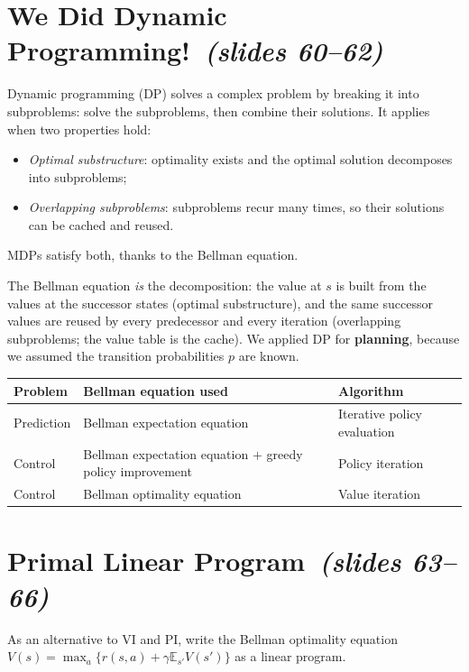\documentclass[11pt,a4paper]{article}
\newcommand{\E}{\mathbb{E}}
\newcommand{\sltag}[1]{\texorpdfstring{\ \emph{(slides #1)}}{ (slides #1)}}
\theoremstyle{plain}
\theoremstyle{definition}
\theoremstyle{remark}
\begin{document}
\section{We Did Dynamic Programming!\sltag{60--62}}
Dynamic programming (DP) solves a complex problem by breaking it into subproblems: solve the subproblems, then combine their solutions. It applies when two properties hold:
\begin{itemize}[itemsep=1pt]
\item \emph{Optimal substructure}: optimality exists and the optimal solution decomposes into subproblems;
\item \emph{Overlapping subproblems}: subproblems recur many times, so their solutions can be cached and reused.
\end{itemize}
MDPs satisfy both, thanks to the Bellman equation.

\begin{intuition}
The Bellman equation \emph{is} the decomposition: the value at $s$ is built from the values at the successor states (optimal substructure), and the same successor values are reused by every predecessor and every iteration (overlapping subproblems; the value table is the cache). We applied DP for \textbf{planning}, because we assumed the transition probabilities $p$ are known.
\end{intuition}

\begin{center}
\begin{tabular}{@{}p{2cm}p{6.6cm}p{4.4cm}@{}}\toprule
\textbf{Problem} & \textbf{Bellman equation used} & \textbf{Algorithm}\\\midrule
Prediction & Bellman expectation equation & Iterative policy evaluation\\
Control & Bellman expectation equation $+$ greedy policy improvement & Policy iteration\\
Control & Bellman optimality equation & Value iteration\\\bottomrule
\end{tabular}
\end{center}

\section{Primal Linear Program\sltag{63--66}}
As an alternative to VI and PI, write the Bellman optimality equation $V(s)=\max_a\{r(s,a)+\gamma\E_{s'}V(s')\}$ as a linear program.
\end{document}
